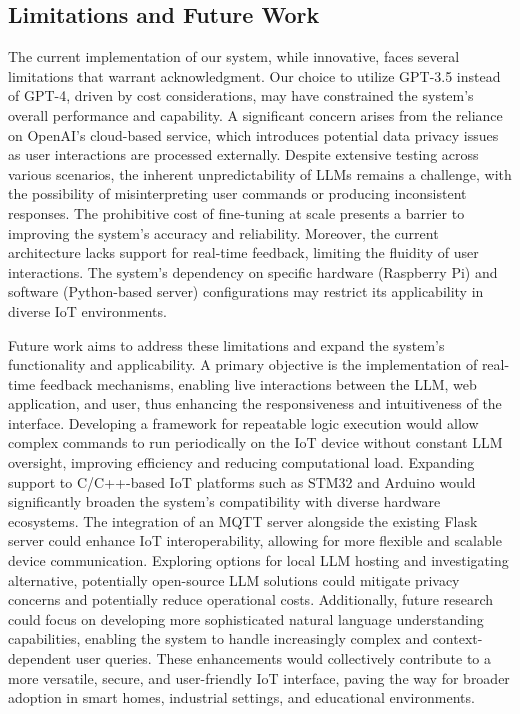 \documentclass{ieeeaccess}
\begin{document}
\subsection{Limitations and Future Work}
The current implementation of our system, while innovative, faces several limitations that warrant acknowledgment. Our choice to utilize GPT-3.5 instead of GPT-4, driven by cost considerations, may have constrained the system's overall performance and capability. A significant concern arises from the reliance on OpenAI's cloud-based service, which introduces potential data privacy issues as user interactions are processed externally. Despite extensive testing across various scenarios, the inherent unpredictability of LLMs remains a challenge, with the possibility of misinterpreting user commands or producing inconsistent responses. The prohibitive cost of fine-tuning at scale presents a barrier to improving the system's accuracy and reliability. Moreover, the current architecture lacks support for real-time feedback, limiting the fluidity of user interactions. The system's dependency on specific hardware (Raspberry Pi) and software (Python-based server) configurations may restrict its applicability in diverse IoT environments.

Future work aims to address these limitations and expand the system's functionality and applicability. A primary objective is the implementation of real-time feedback mechanisms, enabling live interactions between the LLM, web application, and user, thus enhancing the responsiveness and intuitiveness of the interface. Developing a framework for repeatable logic execution would allow complex commands to run periodically on the IoT device without constant LLM oversight, improving efficiency and reducing computational load. Expanding support to C/C++-based IoT platforms such as STM32 and Arduino would significantly broaden the system's compatibility with diverse hardware ecosystems. The integration of an MQTT server alongside the existing Flask server could enhance IoT interoperability, allowing for more flexible and scalable device communication. Exploring options for local LLM hosting and investigating alternative, potentially open-source LLM solutions could mitigate privacy concerns and potentially reduce operational costs. Additionally, future research could focus on developing more sophisticated natural language understanding capabilities, enabling the system to handle increasingly complex and context-dependent user queries. These enhancements would collectively contribute to a more versatile, secure, and user-friendly IoT interface, paving the way for broader adoption in smart homes, industrial settings, and educational environments.
\end{document}
